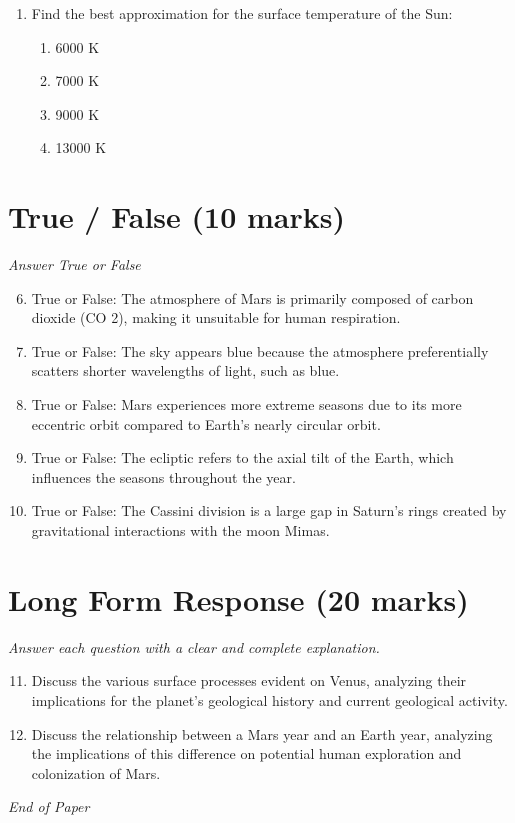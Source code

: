 \documentclass[12pt]{article}
\begin{document}
\begin{enumerate}[label=\arabic*.]
\begin{enumerate}[label=(\alph*)]
    \item m*v
    \item 0.5*m/($R^3$)
    \item 0.5*m*(2 GM/R)
    \item 0.6*G($M^2$)/R
\end{enumerate}
\item Find the best approximation for the surface temperature of the Sun:
\begin{enumerate}[label=(\alph*)]
    \item 6000 K
    \item 7000 K
    \item 9000 K
    \item 13000 K
\end{enumerate}
\end{enumerate}

\section*{True / False (10 marks)}
\textit{Answer True or False}
\begin{enumerate}[label=\arabic*.]
\setcounter{enumi}{5}
\item True or False: The atmosphere of Mars is primarily composed of carbon dioxide (CO 2), making it unsuitable for human respiration.
\item True or False: The sky appears blue because the atmosphere preferentially scatters shorter wavelengths of light, such as blue.
\item True or False: Mars experiences more extreme seasons due to its more eccentric orbit compared to Earth's nearly circular orbit.
\item True or False: The ecliptic refers to the axial tilt of the Earth, which influences the seasons throughout the year.
\item True or False: The Cassini division is a large gap in Saturn's rings created by gravitational interactions with the moon Mimas.
\end{enumerate}

\section*{Long Form Response (20 marks)}
\textit{Answer each question with a clear and complete explanation.}
\begin{enumerate}[label=\arabic*.]
\setcounter{enumi}{10}
\item Discuss the various surface processes evident on Venus, analyzing their implications for the planet's geological history and current geological activity.
\item Discuss the relationship between a Mars year and an Earth year, analyzing the implications of this difference on potential human exploration and colonization of Mars.
\end{enumerate}

\vfill
\noindent\textit{End of Paper}
\end{document}
